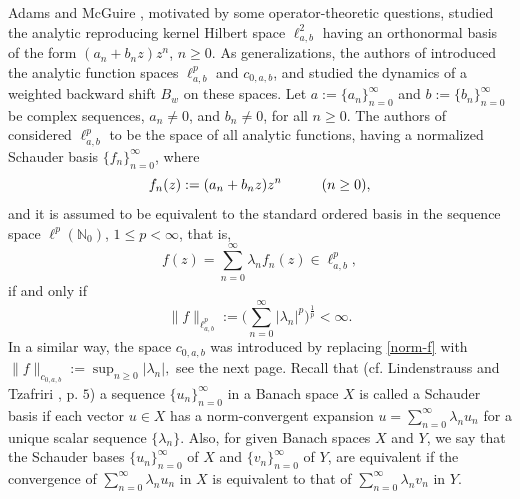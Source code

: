 \documentclass[12pt, reqno]{amsart}
\theoremstyle{definition}
\theoremstyle{remark}
\numberwithin{equation}{section}
\begin{document}
Adams and McGuire \cite{Adams-McGuire}, motivated by some operator-theoretic questions, studied the analytic reproducing kernel Hilbert space $\ell^2_{a,b}$ having an orthonormal basis of the form $(a_n+b_nz)z^n$, $n\geq 0$. As generalizations, the authors of \cite{Das-Mundayadan} introduced the analytic function spaces $\ell^p_{a,b}$ and $c_{0,a,b}$, and studied the dynamics of a weighted backward shift $B_w$ on these spaces. Let $a:=\{a_n\}_{n=0}^{\infty}$ and $b:=\{b_n\}_{n=0}^{\infty}$ be complex sequences, $a_n\neq 0$, and $b_n\neq 0$, for all $n\geq 0$. The authors of \cite{Das-Mundayadan} considered $\ell^p_{a,b}$ to be the space of all analytic functions, having a normalized Schauder basis $\{f_n\}_{n=0}^{\infty}$, where $$f_n(z):=(a_n+b_nz)z^n \hskip 1cm (n\geq 0),$$ and it is assumed to be equivalent to the standard ordered basis in the sequence space $\ell^p(\mathbb{N}_{0})$, $1\leq p < \infty$, that is,  
\begin{equation}\label{Laurent}
f(z)=\sum_{n=0}^{\infty}\lambda_{n}f_{n}(z) \in \ell^p_{a,b},
\end{equation}
if and only if
\begin{equation}\label{norm-f}
\lVert f \rVert_{\ell^p_{a,b}}:=\Big(\sum_{n=0}^{\infty}\lvert\lambda_{n}\rvert^{p}\Big)^{\frac{1}{p}}<\infty.
\end{equation}
In a similar way, the space $c_{0,a,b}$ was introduced by replacing \eqref{norm-f} with $\|f\|_{c_{0,a,b}} := \sup_{n \ge 0} |\lambda_{n}|,$ see the next page. Recall that (cf. Lindenstrauss and Tzafriri \cite{Lindenstrauss}, p. $5$) a sequence $\{u_n\}_{n=0}^{\infty}$ in a Banach space $X$ is called a Schauder basis if each vector $u\in X$ has a norm-convergent expansion $u=\sum_{n=0}^{\infty} \lambda_n u_n$ for a unique scalar sequence $\{\lambda_n\}$. Also, for given Banach spaces $X$ and $Y$, we say that the Schauder bases $\{u_{n}\}_{n=0}^{\infty}$ of $X$ and $\{v_{n}\}_{n=0}^{\infty}$ of $Y$, are equivalent if the convergence of $\sum_{n=0}^{\infty}\lambda_{n}u_{n}$ in $X$ is equivalent to that of $\sum_{n=0}^{\infty}\lambda_{n}v_{n}$ in $Y$.  
\end{document}
